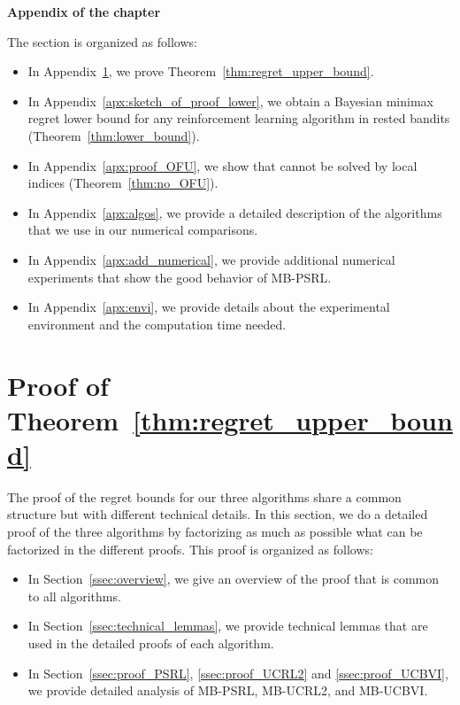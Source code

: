 \begin{subappendices}

\begin{center}
    \bfseries \Large Appendix of the chapter
\end{center}

The section is organized as follows:
\begin{itemize}
    \item In Appendix~\ref{apx:proof_thm1}, we prove Theorem~\ref{thm:regret_upper_bound}. 
    \item In Appendix~\ref{apx:sketch_of_proof_lower}, we obtain a Bayesian minimax regret lower bound for any reinforcement learning algorithm in rested bandits (Theorem~\ref{thm:lower_bound}).
    \item In Appendix~\ref{apx:proof_OFU}, we show that  cannot be solved by local indices (Theorem~\ref{thm:no_OFU}).
    \item In Appendix~\ref{apx:algos}, we provide a detailed description of the algorithms that we use in our numerical comparisons. 
    \item In Appendix~\ref{apx:add_numerical}, we provide additional numerical experiments that show the good behavior of MB-PSRL. 
    \item In Appendix~\ref{apx:envi}, we provide details about the experimental environment and the computation time needed. 
\end{itemize}

\section{Proof of Theorem~\ref{thm:regret_upper_bound}}
\label{apx:proof_thm1}

The proof of the regret bounds for our three algorithms share a common structure but with different technical details.  In this section, we do a detailed proof of the three algorithms by factorizing as much as possible what can be factorized in the different proofs. This proof is organized as follows:
\begin{itemize}
    \item In Section~\ref{ssec:overview}, we give an overview of the proof that is common to all algorithms. 
    \item In Section~\ref{ssec:technical_lemmas}, we provide technical lemmas that are used in the detailed proofs of each algorithm. 
    \item In Section~\ref{ssec:proof_PSRL}, \ref{ssec:proof_UCRL2} and \ref{ssec:proof_UCBVI}, we provide detailed analysis of MB-PSRL, MB-UCRL2, and MB-UCBVI. 
\end{itemize}


\end{subappendices}
